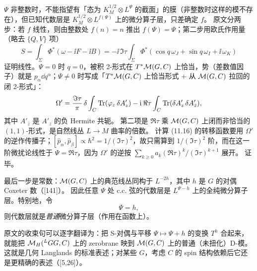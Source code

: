 \(\Psi\) 非整数时，不能指望有「态为 \(K_M^{1/2}\otimes L^{\Psi}\) 的截面」的膜（非整数时这样的模不存在），但已知代数层是 \(K_M^{1/2}\otimes L^{f(\Psi)}\) 上的微分算子层，只差确定 \(f\)。\pA{} 原文分两步：若 \(f\) 线性，则由整数处 \(f(n)=n\) 推出 \(f(\Psi)=\Psi\)；第二步用欧氏作用量（略去 \(\{Q,V\}\) 项）
\begin{equation}
S=\int_\Sigma\Phi^*(\omega-\ii F-\ii B)
=-\ii\,\Im\tau\int_\Sigma\Phi^*(\cos q\,\omega_J+\sin q\,\omega_I+\ii\,\omega_K)
\label{eq:S-euclid}
\end{equation}
证明线性。\(\Psi=0\) 时 \(q=0\)，被积 2-形式在 \(T^*\mathcal{M}(G,C)\) 上恰当，势（差数值因子）就是 \(p_\alpha\dd q^\alpha\)；\(\Psi\neq0\) 时写成「\(T^*\mathcal{M}(G,C)\) 上恰当形式 + 从 \(\mathcal{M}(G,C)\) 拉回的闭 2-形式」：
\begin{equation}
\Omega'=\frac{\Im\tau}{\pi}\,\delta\int_C\operatorname{Tr}(\varphi_z\,\delta A'_z)
-\mathrm{i}\,\Re\tau\int_C\operatorname{Tr}(\delta A'_z\,\delta A'_{\bar z}),
\label{eq:Omega-prime}
\end{equation}
其中 \(A'_{\bar z}\) 是 \(A'_z\) 的负 Hermite 共轭。\pA{} 第二项是 \(\Re\tau\) 乘 \(\mathcal{M}(G,C)\) 上闭而非恰当的 \((1,1)\)-形式，是自然线丛 \(L\to M\) 曲率的倍数。\pA{} 计算 (11.16) 的转移函数要用 \(\Omega'\) 的逆作传播子；\([\hat p_\alpha,\hat p_\beta]\propto\hbar^2=1/(\Im\tau)^2\)，故只需算到 \(1/(\Im\tau)^2\) 阶，而在这一阶微扰论线性于 \(\Psi=\Re\tau\)，因为 \(\Omega'\) 的逆按 \(\sum_{k\ge0}a_k(\Re\tau)^k/(\Im\tau)^{k+1}\) 展开。\pA{} 证毕。

最后一步是常数：\(\mathcal{M}(G,C)\) 上的典范线丛同构于 \(L^{-2h}\)，其中 \(h\) 是 \(G\) 的对偶 Coxeter 数（[141]）。\pA{} 因此任意 \(\Psi\) 处 c.c. 弦的代数层是 \(L^{\Psi-h}\) 上的全纯微分算子层。特别地，令
\begin{equation}
\Psi=h,
\label{eq:Psi-h}
\end{equation}
则代数层就是\emph{普通}微分算子层（作用在函数上）。\pA{}

\begin{keyidea}
原文的收束句可以逐字翻译为：把 S-对偶与平移 \(\Psi\mapsto\Psi+h\) 的变换 \(T^h\) 合起来，就能把 \(\mathcal{M}_H({}^{L}G G,C)\) 上的 zerobrane 映到 \(\mathcal{M}(G,C)\) 上的普通（未扭化）D-模。\pA{} 这就是几何 Langlands 的标准表述；对某些 \(G\)，考虑 \(C\) 的 spin 结构依赖后它还是更精确的表述（[5,26]）。\pA{}
\end{keyidea}

